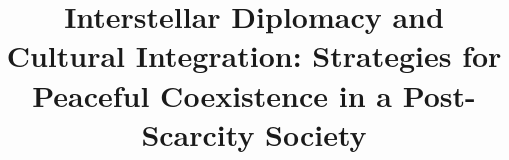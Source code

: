 

\def\titlemain{Interstellar Diplomacy and Cultural Integration: Strategies for Peaceful Coexistence in a Post-Scarcity Society}
\def\titlesub{}
\title{\titlemain}

\def\authorforename{Diziet}
\def\authorsurname{Sma}
\def\author{\authorforename\ \authorsurname}

\def\faculty{Special Circumstances}
\def\institution{GCU Arbitrary}
\def\institutionlogo{images/examples/cc-zero.png}

\makeatletter
\let\inserttitle\@title
\let\insertauthor\@author
\let\insertdate\@date
\makeatother

\setlength{\parskip}{4mm}

\newcommand{\AwAg}{Awareness Agent\xspace}
\newcommand{\awag}{awareness agent\xspace}
\newcommand{\AwAgs}{Awareness Agents\xspace}
\newcommand{\awags}{awareness agents\xspace}



